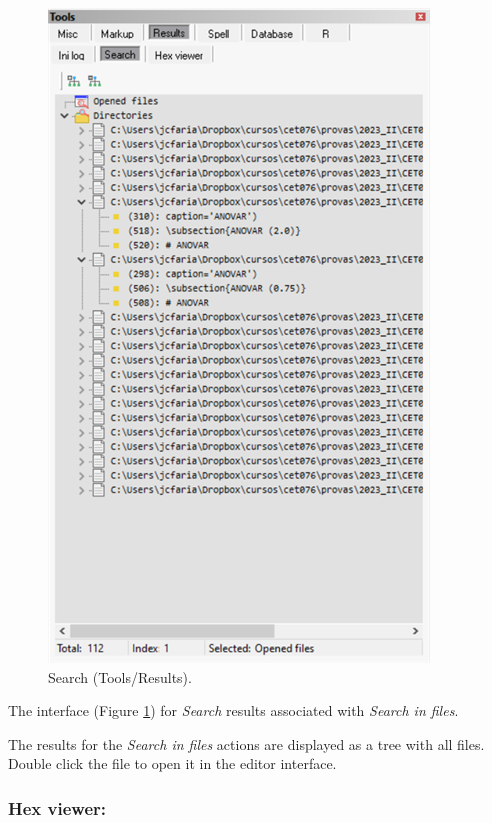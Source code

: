 \begin{figure}[H]
  \includegraphics[scale=0.6]{./res/tools_results_search.png}
  \caption{Search (Tools/Results).}
  \label{fig:tools_results_search}
\end{figure}

The interface
(Figure \ref{fig:tools_results_search})
for \textit{Search} results associated with \textit{Search in files}.

The results for the \textit{Search in files} actions are displayed
as a tree with all files. Double click the file to open it in
the editor interface.


\subsubsection{Hex viewer:}\\


